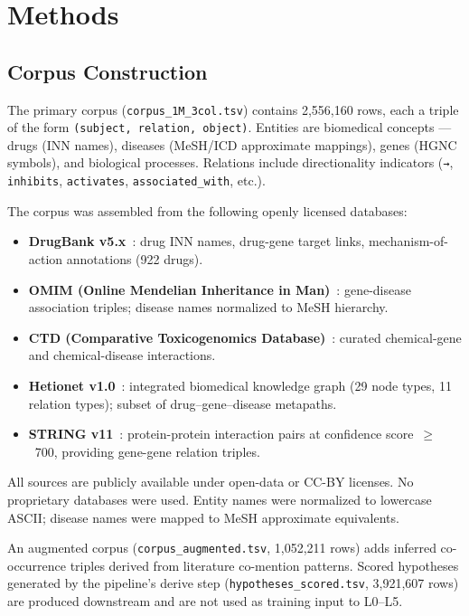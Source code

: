 \documentclass[11pt]{article}
\begin{document}
\section{Methods}
\label{sec:methods}

\subsection{Corpus Construction}
\label{sec:corpus}

The primary corpus (\texttt{corpus\_1M\_3col.tsv}) contains 2,556,160 rows,
each a triple of the form \texttt{(subject, relation, object)}.
Entities are biomedical concepts — drugs (INN names), diseases (MeSH/ICD
approximate mappings), genes (HGNC symbols), and biological processes.
Relations include directionality indicators (\texttt{→}, \texttt{inhibits},
\texttt{activates}, \texttt{associated\_with}, etc.).

The corpus was assembled from the following openly licensed databases:
\begin{itemize}[noitemsep]
  \item \textbf{DrugBank v5.x}~\cite{wishart2018drugbank}: drug INN names, drug-gene
    target links, mechanism-of-action annotations (922 drugs).
  \item \textbf{OMIM (Online Mendelian Inheritance in Man)}~\cite{hamosh2005omim}:
    gene-disease association triples; disease names normalized to MeSH hierarchy.
  \item \textbf{CTD (Comparative Toxicogenomics Database)}~\cite{davis2023ctd}:
    curated chemical-gene and chemical-disease interactions.
  \item \textbf{Hetionet v1.0}~\cite{himmelstein2017systematic}: integrated
    biomedical knowledge graph (29 node types, 11 relation types); subset of
    drug--gene--disease metapaths.
  \item \textbf{STRING v11}~\cite{szklarczyk2023string}: protein-protein interaction
    pairs at confidence score~$\geq$~700, providing gene-gene relation triples.
\end{itemize}
All sources are publicly available under open-data or CC-BY licenses.
No proprietary databases were used. Entity names were normalized to
lowercase ASCII; disease names were mapped to MeSH approximate equivalents.

An augmented corpus (\texttt{corpus\_augmented.tsv}, 1,052,211 rows) adds
inferred co-occurrence triples derived from literature co-mention patterns.
Scored hypotheses generated by the pipeline's derive step
(\texttt{hypotheses\_scored.tsv}, 3,921,607 rows) are produced downstream
and are not used as training input to L0--L5.
\end{document}
